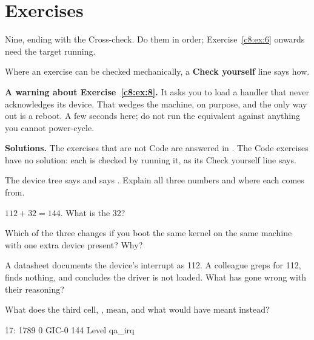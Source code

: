 
\section{Exercises}
\label{c8:sec:exercises}\label{c8:app:c}

\begin{aside}
Nine, ending with the Cross-check. Do them in order; Exercise~\ref{c8:ex:6} onwards need the target
running.

Where an exercise can be checked mechanically, a \textbf{Check yourself} line says how.

\textbf{A warning about Exercise~\ref{c8:ex:8}.} It asks you to load a handler that never
acknowledges its device. That wedges the machine, on purpose, and the only way out is a reboot. A
few seconds here; do not run the equivalent against anything you cannot power-cycle.

\textbf{Solutions.} The exercises that are not Code are answered in . The Code
exercises have no solution: each is checked by running it, as its Check yourself line says.
\end{aside}

\label{c8:ex:1}

 The device tree says  and  says
. Explain all three numbers and where each comes from.

 $112 + 32 = 144$. What is the 32?

 Which of the three changes if you boot the same kernel on the same machine with one extra
device present? Why?

 A datasheet documents the device's interrupt as 112. A colleague greps
 for 112, finds nothing, and concludes the driver is not loaded. What has
gone wrong with their reasoning?

 What does the third cell, , mean, and what would  have meant instead?

\label{c8:ex:2}

\begin{console}
 17:       1789          0  GIC-0 144 Level     qa_irq
\end{console}

